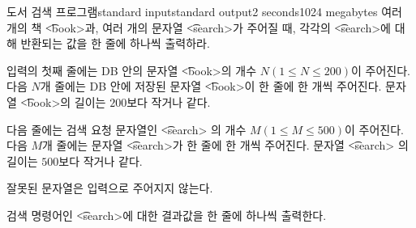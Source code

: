 \begin{problem}{도서 검색 프로그램}{standard input}{standard output}{2 seconds}{1024 megabytes}
여러 개의 책 \t{<book>}과, 여러 개의 문자열 \t{<search>}가 주어질 때, 각각의 \t{<search>}에 대해 반환되는 값을 한 줄에 하나씩 출력하라.

\InputFile
입력의 첫째 줄에는 DB 안의 문자열 \t{<book>}의 개수 $N(1≤N≤200)$이 주어진다. 다음 $N$개 줄에는 DB 안에 저장된 문자열 \t{<book>}이 한 줄에 한 개씩 주어진다. 문자열 \t{<book>}의 길이는 $200$보다 작거나 같다.

다음 줄에는 검색 요청 문자열인 \t{<search>} 의 개수 $M(1≤M≤500)$이 주어진다. 다음 $M$개 줄에는 문자열 \t{<search>}가 한 줄에 한 개씩 주어진다.  문자열 \t{<search>} 의 길이는 $500$보다 작거나 같다.

잘못된 문자열은 입력으로 주어지지 않는다.

\OutputFile
검색 명령어인 \t{<search>}에 대한 결과값을 한 줄에 하나씩 출력한다.

\Example

\begin{example}
%
\end{example}

\end{problem}

